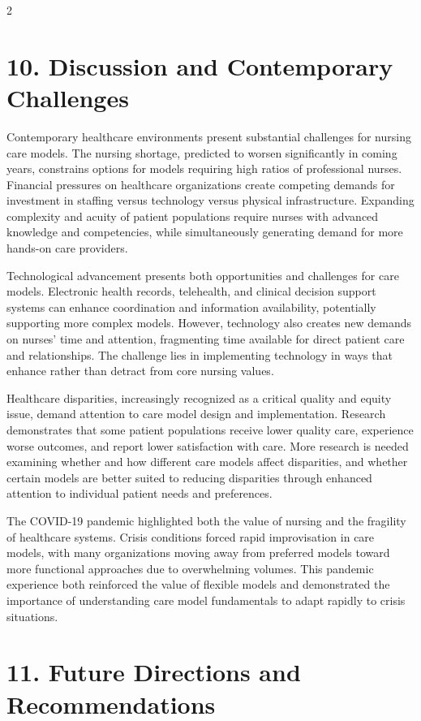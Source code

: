 \documentclass[12pt]{article}
\begin{document}
\begin{multicols}{2}
\section*{10. \quad Discussion and Contemporary Challenges}

Contemporary healthcare environments present substantial challenges for nursing care models. The nursing shortage, predicted to worsen significantly in coming years, constrains options for models requiring high ratios of professional nurses. Financial pressures on healthcare organizations create competing demands for investment in staffing versus technology versus physical infrastructure. Expanding complexity and acuity of patient populations require nurses with advanced knowledge and competencies, while simultaneously generating demand for more hands-on care providers.

Technological advancement presents both opportunities and challenges for care models. Electronic health records, telehealth, and clinical decision support systems can enhance coordination and information availability, potentially supporting more complex models. However, technology also creates new demands on nurses' time and attention, fragmenting time available for direct patient care and relationships. The challenge lies in implementing technology in ways that enhance rather than detract from core nursing values.

Healthcare disparities, increasingly recognized as a critical quality and equity issue, demand attention to care model design and implementation. Research demonstrates that some patient populations receive lower quality care, experience worse outcomes, and report lower satisfaction with care. More research is needed examining whether and how different care models affect disparities, and whether certain models are better suited to reducing disparities through enhanced attention to individual patient needs and preferences.

The COVID-19 pandemic highlighted both the value of nursing and the fragility of healthcare systems. Crisis conditions forced rapid improvisation in care models, with many organizations moving away from preferred models toward more functional approaches due to overwhelming volumes. This pandemic experience both reinforced the value of flexible models and demonstrated the importance of understanding care model fundamentals to adapt rapidly to crisis situations.

\section*{11. \quad Future Directions and Recommendations}


\end{multicols}
\end{document}
